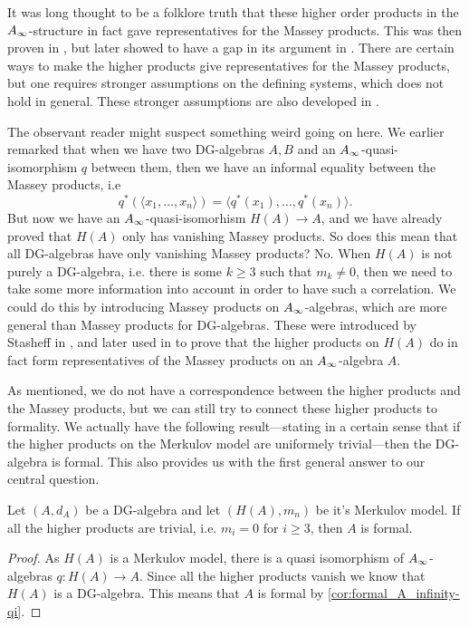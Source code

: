 It was long thought to be a folklore truth that these higher order products in the $A_{\infty}$-structure in fact gave representatives for the Massey products. This was then proven in \cite{Ext}, but later showed to have a gap in its argument in \cite{detection}. There are certain ways to make the higher products give representatives for the Massey products, but one requires stronger assumptions on the defining systems, which does not hold in general. These stronger assumptions are also developed in \cite{detection}. 

\begin{remark}
The observant reader might suspect something weird going on here. We earlier remarked that when we have two DG-algebras $A, B$ and an $A_{\infty}$-quasi-isomorphism $q$ between them, then we have an informal equality between the Massey products, i.e 
\begin{equation*}
	q^*(\langle x_1, \ldots, x_n\rangle ) = \langle q^*(x_1),\ldots, q^*(x_n)\rangle .
\end{equation*}
But now we have an $A_{\infty}$-quasi-isomorhism $H(A)\longrightarrow A$, and we have already proved that $H(A)$ only has vanishing Massey products. So does this mean that all DG-algebras have only vanishing Massey products? No. When $H(A)$ is not purely a DG-algebra, i.e. there is some $k\geq 3$ such that $m_k\neq 0$, then we need to take some more information into account in order to have such a correlation. We could do this by introducing Massey products on $A_{\infty}$-algebras, which are more general than Massey products for DG-algebras. These were introduced by Stasheff in \cite{h-spaces}, and later used in \cite{infty-massey} to prove that the higher products on $H(A)$ do in fact form representatives of the Massey products on an $A_{\infty}$-algebra $A$.
\end{remark}

As mentioned, we do not have a correspondence between the higher products and the Massey products, but we can still try to connect these higher products to formality. We actually have the following result---stating in a certain sense that if the higher products on the Merkulov model are uniformely trivial---then the DG-algebra is formal. This also provides us with the first general answer to our central question.

\begin{theorem}
\label{thm:formal_iff_no_infty_massey}
Let $(A, d_A)$ be a DG-algebra and let $(H(A), m_n)$ be it's Merkulov model. If all the higher products are trivial, i.e. $m_i = 0$ for $i\geq 3$, then $A$ is formal. 
\end{theorem}
\begin{proof}
As $H(A)$ is a Merkulov model, there is a quasi isomorphism of $A_{\infty}$-algebras $q:H(A)\longrightarrow A$. Since all the higher products vanish we know that $H(A)$ is a DG-algebra. This means that $A$ is formal by \cref{cor:formal_A_infinity-qi}. 
\end{proof}


